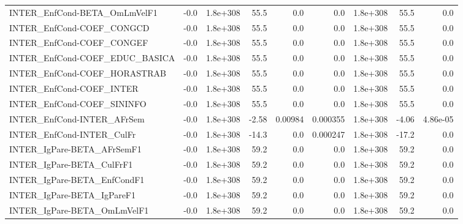 \begin{tabular}{lrrrrrrrr}
INTER\_EnfCond-BETA\_OmLmVelF1          &        -0.0 &     1.8e+308 &    55.5 &      0.0 &        0.0 &    1.8e+308 &         55.5 &           0.0 \\
INTER\_EnfCond-COEF\_CONGCD             &        -0.0 &     1.8e+308 &    55.5 &      0.0 &        0.0 &    1.8e+308 &         55.5 &           0.0 \\
INTER\_EnfCond-COEF\_CONGEF             &        -0.0 &     1.8e+308 &    55.5 &      0.0 &        0.0 &    1.8e+308 &         55.5 &           0.0 \\
INTER\_EnfCond-COEF\_EDUC\_BASICA        &        -0.0 &     1.8e+308 &    55.5 &      0.0 &        0.0 &    1.8e+308 &         55.5 &           0.0 \\
INTER\_EnfCond-COEF\_HORASTRAB          &        -0.0 &     1.8e+308 &    55.5 &      0.0 &        0.0 &    1.8e+308 &         55.5 &           0.0 \\
INTER\_EnfCond-COEF\_INTER              &        -0.0 &     1.8e+308 &    55.5 &      0.0 &        0.0 &    1.8e+308 &         55.5 &           0.0 \\
INTER\_EnfCond-COEF\_SININFO            &        -0.0 &     1.8e+308 &    55.5 &      0.0 &        0.0 &    1.8e+308 &         55.5 &           0.0 \\
INTER\_EnfCond-INTER\_AFrSem            &        -0.0 &     1.8e+308 &   -2.58 &  0.00984 &   0.000355 &    1.8e+308 &        -4.06 &      4.86e-05 \\
INTER\_EnfCond-INTER\_CulFr             &        -0.0 &     1.8e+308 &   -14.3 &      0.0 &   0.000247 &    1.8e+308 &        -17.2 &           0.0 \\
INTER\_IgPare-BETA\_AFrSemF1            &        -0.0 &     1.8e+308 &    59.2 &      0.0 &        0.0 &    1.8e+308 &         59.2 &           0.0 \\
INTER\_IgPare-BETA\_CulFrF1             &        -0.0 &     1.8e+308 &    59.2 &      0.0 &        0.0 &    1.8e+308 &         59.2 &           0.0 \\
INTER\_IgPare-BETA\_EnfCondF1           &        -0.0 &     1.8e+308 &    59.2 &      0.0 &        0.0 &    1.8e+308 &         59.2 &           0.0 \\
INTER\_IgPare-BETA\_IgPareF1            &        -0.0 &     1.8e+308 &    59.2 &      0.0 &        0.0 &    1.8e+308 &         59.2 &           0.0 \\
INTER\_IgPare-BETA\_OmLmVelF1           &        -0.0 &     1.8e+308 &    59.2 &      0.0 &        0.0 &    1.8e+308 &         59.2 &           0.0 \\

\end{tabular}
